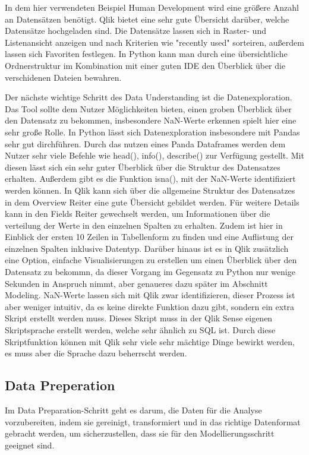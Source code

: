 \documentclass[12pt]{article}
\begin{document}
	In dem hier verwendeten Beispiel Human Development wird eine größere Anzahl an Datensätzen benötigt. Qlik bietet eine sehr gute Übersicht darüber, welche Datensätze hochgeladen sind. Die Datensätze lassen sich in Raster- und Listenansicht anzeigen und nach Kriterien wie "recently used" sorteiren, außerdem lassen sich Favoriten festlegen. In Python kann man durch eine übersichtliche Ordnerstruktur im Kombination mit einer guten IDE den Überblick über die verschidenen Dateien bewahren.
	
	Der nächste wichtige Schritt des Data Understanding ist die Datenexploration. Das Tool sollte dem Nutzer Möglichkeiten bieten, einen groben Überblick über den Datensatz zu bekommen, insbesondere NaN-Werte erkennen spielt hier eine sehr große Rolle.
	In Python lässt sich Datenexploration insbesondere mit Pandas sehr gut dirchführen. Durch das nutzen eines Panda Dataframes werden dem Nutzer sehr viele Befehle wie head(), info(), describe() zur Verfügung gestellt. Mit diesen lässt sich ein sehr guter Überblick über die Struktur des Datensatzes erhalten. Außerdem gibt es die Funktion isna(), mit der NaN-Werte identifiziert werden können.	
	In Qlik kann sich über die allgemeine Struktur des Datensatzes in dem Overview Reiter eine gute Übersicht gebildet werden. Für weitere Details kann in den Fields Reiter gewechselt werden, um Informationen über die verteilung der Werte in den einzelnen Spalten zu erhalten. Zudem ist hier in Einblick der ersten 10 Zeilen in Tabellenform zu finden und eine Auflistung der einzelnen Spalten inklusive Datentyp. Darüber hinaus ist es in Qlik zusätzlich eine Option, einfache Visualisierungen zu erstellen um einen Überblick über den Datensatz zu bekommn, da dieser Vorgang im Gegensatz zu Python nur wenige Sekunden in Anspruch nimmt, aber genaueres dazu später im Abschnitt Modeling. NaN-Werte lassen sich mit Qlik zwar identifizieren, dieser Prozess ist aber weniger intuitiv, da es keine direkte Funktion dazu gibt, sondern ein extra Skript erstellt werden muss. Dieses Skript muss in der Qlik Sense eigenen Skriptsprache erstellt werden, welche sehr ähnlich zu SQL ist. Durch diese Skriptfunktion können mit Qlik sehr viele sehr mächtige Dinge bewirkt werden, es muss aber die Sprache dazu beherrscht werden.
	
	\subsection{Data Preperation}
	Im Data Preparation-Schritt geht es darum, die Daten für die Analyse vorzubereiten, indem sie gereinigt, transformiert und in das richtige Datenformat gebracht werden, um sicherzustellen, dass sie für den Modellierungsschritt geeignet sind.
	
\end{document}

